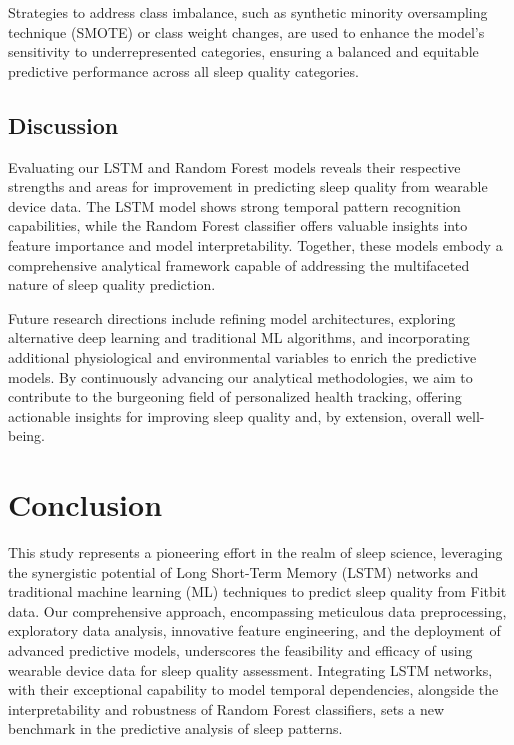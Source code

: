 \documentclass[10pt]{extarticle}
\begin{document}
Strategies to address class imbalance, such as synthetic minority oversampling technique (SMOTE) or class weight changes, are used to enhance the model's sensitivity to underrepresented categories, ensuring a balanced and equitable predictive performance across all sleep quality categories.

\subsection{Discussion}

Evaluating our LSTM and Random Forest models reveals their respective strengths and areas for improvement in predicting sleep quality from wearable device data. The LSTM model shows strong temporal pattern recognition capabilities, while the Random Forest classifier offers valuable insights into feature importance and model interpretability. Together, these models embody a comprehensive analytical framework capable of addressing the multifaceted nature of sleep quality prediction.

Future research directions include refining model architectures, exploring alternative deep learning and traditional ML algorithms, and incorporating additional physiological and environmental variables to enrich the predictive models. By continuously advancing our analytical methodologies, we aim to contribute to the burgeoning field of personalized health tracking, offering actionable insights for improving sleep quality and, by extension, overall well-being.

\section{Conclusion}

This study represents a pioneering effort in the realm of sleep science, leveraging the synergistic potential of Long Short-Term Memory (LSTM) networks and traditional machine learning (ML) techniques to predict sleep quality from Fitbit data. Our comprehensive approach, encompassing meticulous data preprocessing, exploratory data analysis, innovative feature engineering, and the deployment of advanced predictive models, underscores the feasibility and efficacy of using wearable device data for sleep quality assessment. Integrating LSTM networks, with their exceptional capability to model temporal dependencies, alongside the interpretability and robustness of Random Forest classifiers, sets a new benchmark in the predictive analysis of sleep patterns.
\end{document}
